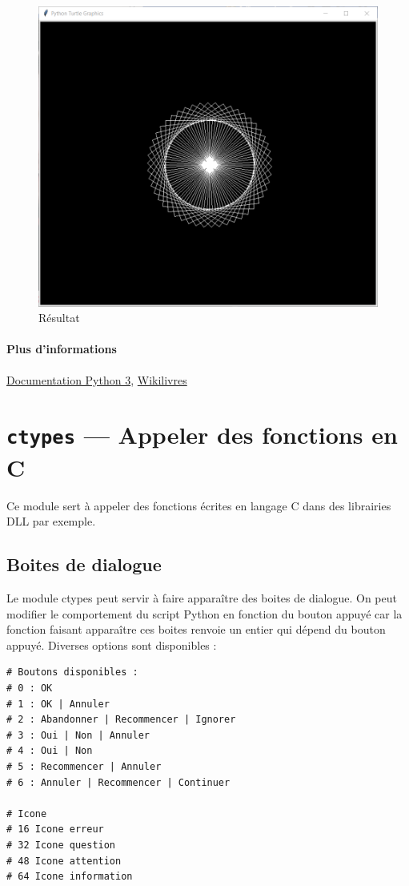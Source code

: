 \documentclass[a4paper, 10pt]{article}
\begin{document}
\begin{figure}[h]
	\begin{center}
		\includegraphics[scale=0.5]{turtle.PNG}
		\caption*{Résultat}
	\end{center}
\end{figure}

\paragraph{Plus d'informations} \href{https://docs.python.org/fr/3.6/library/turtle.html#methods-specific-to-screen-not-inherited-from-turtlescreen}{Documentation Python 3}, \href{https://fr.wikibooks.org/wiki/Programmation_Python/Turtle}{Wikilivres}

\section{\texttt{ctypes} --- Appeler des fonctions en C}
Ce module sert à appeler des fonctions écrites en langage C dans des librairies DLL par exemple.
\subsection{Boites de dialogue}
Le module ctypes peut servir à faire apparaître des boites de dialogue. On peut modifier le comportement du script Python en fonction du bouton appuyé car la fonction faisant apparaître ces boites renvoie un entier qui dépend du bouton appuyé. Diverses options sont disponibles :
\begin{verbatim}
# Boutons disponibles :
# 0 : OK
# 1 : OK | Annuler
# 2 : Abandonner | Recommencer | Ignorer
# 3 : Oui | Non | Annuler
# 4 : Oui | Non
# 5 : Recommencer | Annuler
# 6 : Annuler | Recommencer | Continuer

# Icone
# 16 Icone erreur
# 32 Icone question
# 48 Icone attention
# 64 Icone information
\end{verbatim}
\end{document}
